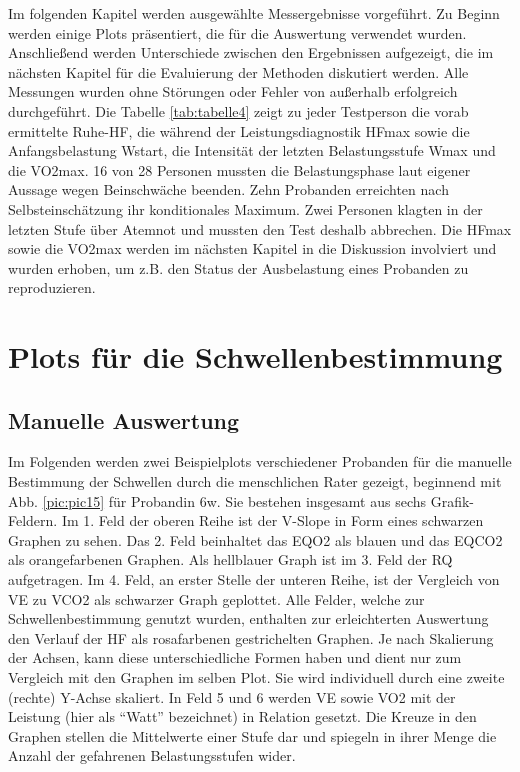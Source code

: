 Im folgenden Kapitel werden ausgewählte Messergebnisse vorgeführt. Zu Beginn werden einige Plots präsentiert, die für die Auswertung verwendet wurden. Anschließend werden Unterschiede zwischen den Ergebnissen aufgezeigt, die im nächsten Kapitel für die Evaluierung der Methoden diskutiert werden. Alle Messungen wurden ohne Störungen oder Fehler von außerhalb erfolgreich durchgeführt. Die Tabelle \ref{tab:tabelle4} zeigt zu jeder Testperson die vorab ermittelte Ruhe-\acs{HF}, die während der Leistungsdiagnostik \ac{HFmax} sowie die Anfangsbelastung \acs{Wstart}, die Intensität der letzten Belastungsstufe \acs{Wmax} und die \ac{VO2max}. 16 von 28 Personen mussten die Belastungsphase laut eigener Aussage wegen Beinschwäche beenden. Zehn Probanden erreichten nach Selbsteinschätzung ihr konditionales Maximum. Zwei Personen klagten in der letzten Stufe über Atemnot und mussten den Test deshalb abbrechen. Die \acs{HFmax} sowie die \acs{VO2max} werden im nächsten Kapitel in die Diskussion involviert und wurden erhoben, um z.B. den Status der Ausbelastung eines Probanden zu reproduzieren.

\section{Plots für die Schwellenbestimmung}

\subsection{Manuelle Auswertung}

Im Folgenden werden zwei Beispielplots verschiedener Probanden für die manuelle Bestimmung der Schwellen durch die menschlichen Rater gezeigt, beginnend mit Abb. \ref{pic:pic15} für Probandin 6w. Sie bestehen insgesamt aus sechs Grafik-Feldern. Im 1. Feld der oberen Reihe ist der V-Slope in Form eines schwarzen Graphen zu sehen. Das 2. Feld beinhaltet das \acs{EQO2} als blauen und das \acs{EQCO2} als orangefarbenen Graphen. Als hellblauer Graph ist im 3. Feld der \acs{RQ} aufgetragen. Im 4. Feld, an erster Stelle der unteren Reihe, ist der Vergleich von \acs{VE} zu \acs{VCO2} als schwarzer Graph geplottet. Alle Felder, welche zur Schwellenbestimmung genutzt wurden, enthalten zur erleichterten Auswertung den Verlauf der \acs{HF} als rosafarbenen gestrichelten Graphen. Je nach Skalierung der Achsen, kann diese unterschiedliche Formen haben und dient nur zum Vergleich mit den Graphen im selben Plot. Sie wird individuell durch eine zweite (rechte) Y-Achse skaliert. In Feld 5 und 6 werden \acs{VE} sowie \acs{VO2} mit der Leistung (hier als "`Watt"' bezeichnet) in Relation gesetzt. Die Kreuze in den Graphen stellen die Mittelwerte einer Stufe dar und spiegeln in ihrer Menge die Anzahl der gefahrenen Belastungsstufen wider.

